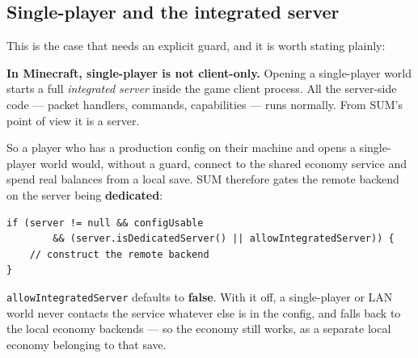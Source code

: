 \documentclass[11pt,a4paper]{article}
\newcommand{\code}[1]{\texttt{\small #1}}
\newcommand{\keybox}[2]{%
  \par\vspace{0.5em}\noindent
  \colorbox{#1}{%
    \begin{minipage}{\dimexpr\linewidth-2\fboxsep\relax}
    \vspace{0.35em}\small #2\vspace{0.35em}
    \end{minipage}}%
  \par\vspace{0.5em}}
\newcommand{\warn}[1]{\keybox{omceWarnWash}{#1}}
\newcommand{\nope}{{\color{omceWarnEdge}\bfseries\large$\times$}}
\begin{document}
\subsection{Single-player and the integrated server}
\label{sec:integrated}

This is the case that needs an explicit guard, and it is worth stating plainly:

\warn{\textbf{In Minecraft, single-player is not client-only.} Opening a single-player world starts
a full \emph{integrated server} inside the game client process. All the server-side code --- packet
handlers, commands, capabilities --- runs normally. From SUM's point of view it is a server.}

So a player who has a production config on their machine and opens a single-player world would,
without a guard, connect to the shared economy service and spend real balances from a local save.
SUM therefore gates the remote backend on the server being \textbf{dedicated}:

\begin{lstlisting}[style=http]
if (server != null && configUsable
        && (server.isDedicatedServer() || allowIntegratedServer)) {
    // construct the remote backend
}
\end{lstlisting}

\code{allowIntegratedServer} defaults to \textbf{false}. With it off, a single-player or LAN world
never contacts the service whatever else is in the config, and falls back to the local economy
backends --- so the economy still works, as a separate local economy belonging to that save.

\begin{figure}[h]
\centering
{}
\end{figure}
\end{document}
